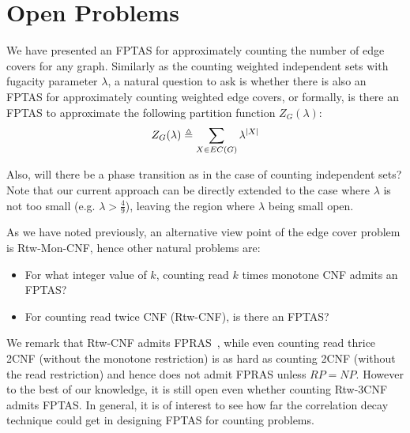 \section{Open Problems}
We have presented an FPTAS for approximately counting the number of edge covers for any graph. Similarly as the counting weighted independent sets with fugacity parameter $\lambda$, a natural question to ask is whether there is also an FPTAS for approximately counting weighted edge covers, or formally, is there an FPTAS to approximate the following partition function $Z_G(\lambda)$:
\[Z_G(\lambda) \triangleq \sum_{X \in EC(G)} \lambda^{\left\vert X\right\vert}\]

Also, will there be a phase transition as in the case of counting independent sets? Note that our current approach can be directly extended to the case where $\lambda$ is not too small (e.g. $\lambda > \frac{4}{9}$), leaving the region where $\lambda$ being small open.

As we have noted previously, an alternative view point of the edge cover problem is Rtw-Mon-CNF, hence other natural problems are:
\begin{itemize}
	\item For what integer value of $k$, counting read $k$ times monotone CNF admits an FPTAS?
	\item For counting read twice CNF (Rtw-CNF), is there an FPTAS?
\end{itemize}
We remark that Rtw-CNF admits FPRAS~\cite{TwiceSAT}, while even counting read thrice 2CNF (without the monotone restriction) is as hard as counting 2CNF (without the read restriction) and hence does not admit FPRAS unless $RP=NP$.
However to the best of our knowledge, it is still open even whether counting Rtw-3CNF admits FPTAS.
In general, it is of interest to see how far the correlation decay technique could get in designing FPTAS for counting problems.
